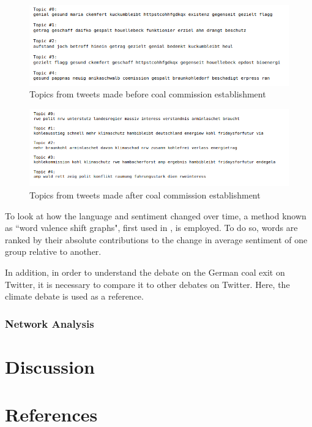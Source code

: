 \documentclass[10pt,twocolumn,twoside]{layout}
\begin{document}
\begin{figure} 
	\begin{center}
		\includegraphics[width=\linewidth]{figures/topics_before}
	\end{center}
	\caption{Topics from tweets made before coal commission establishment}
	\label{fig:topics_before}
\end{figure}
 
\begin{figure} 
	\begin{center}
		\includegraphics[width=\linewidth]{figures/topics_after}
	\end{center}
	\caption{Topics from tweets made after coal commission establishment}
	\label{fig:topics_after}
\end{figure}

To look at how the language and sentiment changed over time, a method known as ``word valence shift graphs", first used in \cite{Dodds2011}, is employed. To do so, words are ranked by their absolute contributions to the change in average sentiment of one group relative to another. 

In addition, in order to understand the debate on the German coal exit on Twitter, it is necessary to compare it to other debates on Twitter. Here, the climate debate is used as a reference. 

\subsubsection*{Network Analysis}



\section*{Discussion} \label{sec:discussion}




\section*{References}

\end{document}
